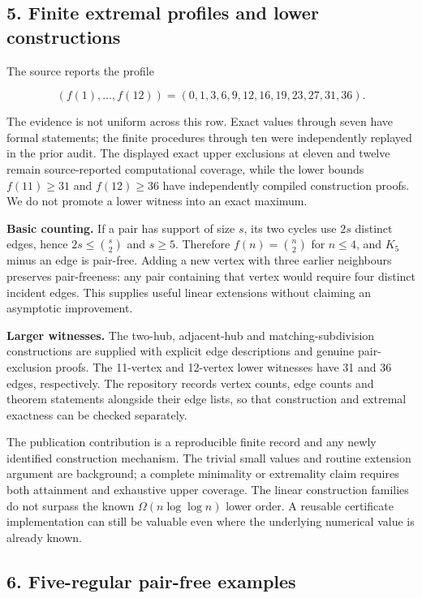 \documentclass[
  11pt,
]{article}
\begin{document}
\subsection{5. Finite extremal profiles and lower
constructions}\label{finite-extremal-profiles-and-lower-constructions}

The source reports the profile

\[
(f(1),\ldots,f(12))=(0,1,3,6,9,12,16,19,23,27,31,36).
\]

The evidence is not uniform across this row. Exact values through seven
have formal statements; the finite procedures through ten were
independently replayed in the prior audit. The displayed exact upper
exclusions at eleven and twelve remain source-reported computational
coverage, while the lower bounds \(f(11)\geq31\) and \(f(12)\geq36\)
have independently compiled construction proofs. We do not promote a
lower witness into an exact maximum.

\textbf{Basic counting.} If a pair has support of size \(s\), its two
cycles use \(2s\) distinct edges, hence \(2s\leq\binom{s}{2}\) and
\(s\geq5\). Therefore \(f(n)=\binom n2\) for \(n\leq4\), and \(K_5\)
minus an edge is pair-free. Adding a new vertex with three earlier
neighbours preserves pair-freeness: any pair containing that vertex
would require four distinct incident edges. This supplies useful linear
extensions without claiming an asymptotic improvement.

\textbf{Larger witnesses.} The two-hub, adjacent-hub and
matching-subdivision constructions are supplied with explicit edge
descriptions and genuine pair-exclusion proofs. The 11-vertex and
12-vertex lower witnesses have 31 and 36 edges, respectively. The
repository records vertex counts, edge counts and theorem statements
alongside their edge lists, so that construction and extremal exactness
can be checked separately.

The publication contribution is a reproducible finite record and any
newly identified construction mechanism. The trivial small values and
routine extension argument are background; a complete minimality or
extremality claim requires both attainment and exhaustive upper
coverage. The linear construction families do not surpass the known
\(\Omega(n\log\log n)\) lower order. A reusable certificate
implementation can still be valuable even where the underlying numerical
value is already known.

\subsection{6. Five-regular pair-free
examples}\label{five-regular-pair-free-examples}
\end{document}
